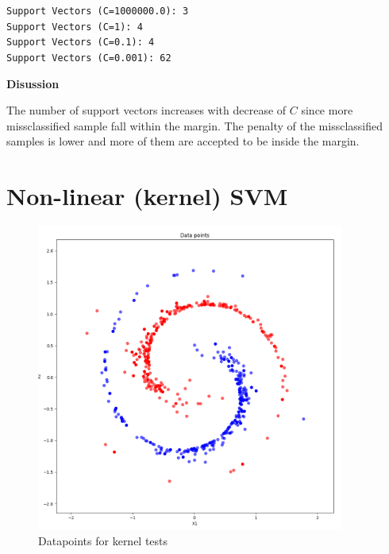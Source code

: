 \documentclass[12pt,a4paper]{article}
\begin{document}
\begin{enumerate}[a)]
\texttt{Support Vectors (C=1000000.0): 3\\
Support Vectors (C=1): 4\\
Support Vectors (C=0.1): 4\\
Support Vectors (C=0.001): 62\\
}

\textbf{Disussion}

The number of support vectors increases with decrease of $C$ since more
missclassified sample fall within the margin. The penalty of the missclassified
samples is lower and more of them are accepted to be inside the margin.

\end{enumerate}

\newpage
\section{Non-linear (kernel) SVM}

\begin{figure}[H]
	\centering
  \includegraphics[width=0.9\textwidth]{figures/datapoints2.png}
	\caption{Datapoints for kernel tests}
	\label{datapoints2}
\end{figure}
\end{document}
